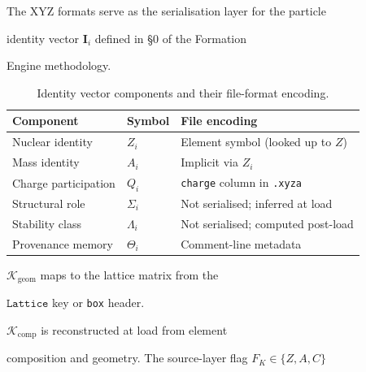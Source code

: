 \documentclass[12pt, a4paper, oneside]{article}
\begin{document}
\label{sec:s0}



The XYZ formats serve as the serialisation layer for the particle

identity vector $\mathbf{I}_i$ defined in \S{}0 of the Formation

Engine methodology.


\begin{table}[htbp]

  \centering

  \caption{Identity vector components and their file-format encoding.}

  \label{tab:s0_map}

  \begin{tabular}{llp{6.5cm}}

    \toprule

    Component & Symbol & File encoding \\

    \midrule

    Nuclear identity     & $Z_i$       & Element symbol (looked up to $Z$) \\

    Mass identity        & $A_i$       & Implicit via $Z_i$ \\

    Charge participation & $Q_i$       & \texttt{charge} column in \texttt{.xyza} \\

    Structural role      & $\Sigma_i$  & Not serialised; inferred at load \\

    Stability class      & $\Lambda_i$ & Not serialised; computed post-load \\

    Provenance memory    & $\Theta_i$  & Comment-line metadata \\

    \bottomrule

  \end{tabular}

\end{table}


$\mathcal{K}_{\text{geom}}$ maps to the lattice matrix from the

$\texttt{Lattice}$ key or \texttt{box} header.

$\mathcal{K}_{\text{comp}}$ is reconstructed at load from element

composition and geometry.  The source-layer flag $F_K \in \{Z, A, C\}$
\end{document}
